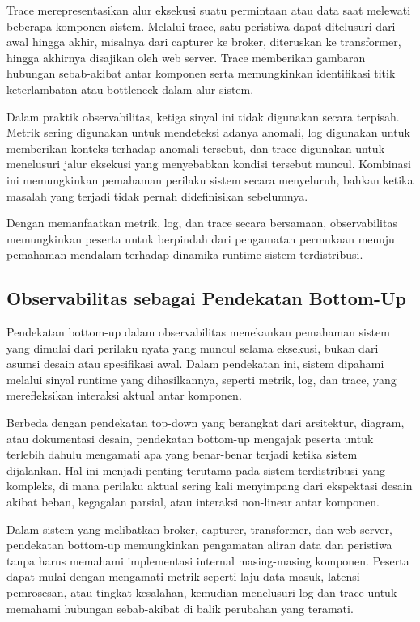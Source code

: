 Trace merepresentasikan alur eksekusi suatu permintaan atau data saat melewati beberapa komponen sistem. Melalui trace, satu peristiwa dapat ditelusuri dari awal hingga akhir, misalnya dari capturer ke broker, diteruskan ke transformer, hingga akhirnya disajikan oleh web server. Trace memberikan gambaran hubungan sebab-akibat antar komponen serta memungkinkan identifikasi titik keterlambatan atau bottleneck dalam alur sistem.

Dalam praktik observabilitas, ketiga sinyal ini tidak digunakan secara terpisah. Metrik sering digunakan untuk mendeteksi adanya anomali, log digunakan untuk memberikan konteks terhadap anomali tersebut, dan trace digunakan untuk menelusuri jalur eksekusi yang menyebabkan kondisi tersebut muncul. Kombinasi ini memungkinkan pemahaman perilaku sistem secara menyeluruh, bahkan ketika masalah yang terjadi tidak pernah didefinisikan sebelumnya.

Dengan memanfaatkan metrik, log, dan trace secara bersamaan, observabilitas memungkinkan peserta untuk berpindah dari pengamatan permukaan menuju pemahaman mendalam terhadap dinamika runtime sistem terdistribusi.


\subsection{Observabilitas sebagai Pendekatan Bottom-Up}

Pendekatan bottom-up dalam observabilitas menekankan pemahaman sistem yang dimulai dari perilaku nyata yang muncul selama eksekusi, bukan dari asumsi desain atau spesifikasi awal. Dalam pendekatan ini, sistem dipahami melalui sinyal runtime yang dihasilkannya, seperti metrik, log, dan trace, yang merefleksikan interaksi aktual antar komponen.

Berbeda dengan pendekatan top-down yang berangkat dari arsitektur, diagram, atau dokumentasi desain, pendekatan bottom-up mengajak peserta untuk terlebih dahulu mengamati apa yang benar-benar terjadi ketika sistem dijalankan. Hal ini menjadi penting terutama pada sistem terdistribusi yang kompleks, di mana perilaku aktual sering kali menyimpang dari ekspektasi desain akibat beban, kegagalan parsial, atau interaksi non-linear antar komponen.

Dalam sistem yang melibatkan broker, capturer, transformer, dan web server, pendekatan bottom-up memungkinkan pengamatan aliran data dan peristiwa tanpa harus memahami implementasi internal masing-masing komponen. Peserta dapat mulai dengan mengamati metrik seperti laju data masuk, latensi pemrosesan, atau tingkat kesalahan, kemudian menelusuri log dan trace untuk memahami hubungan sebab-akibat di balik perubahan yang teramati.

